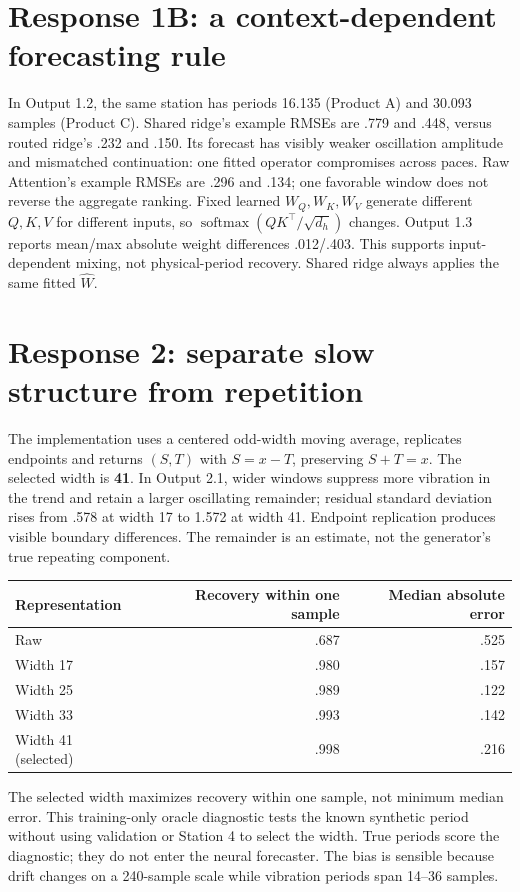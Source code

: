 \documentclass[10pt,a4paper]{article}
\begin{document}
\section*{Response 1B: a context-dependent forecasting rule}
In Output 1.2, the same station has periods 16.135 (Product A) and 30.093 samples (Product C). Shared ridge's example RMSEs are .779 and .448, versus routed ridge's .232 and .150. Its forecast has visibly weaker oscillation amplitude and mismatched continuation: one fitted operator compromises across paces. Raw Attention's example RMSEs are .296 and .134; one favorable window does not reverse the aggregate ranking. Fixed learned $W_Q,W_K,W_V$ generate different $Q,K,V$ for different inputs, so $\operatorname{softmax}(QK^\top/\sqrt{d_h})$ changes. Output 1.3 reports mean/max absolute weight differences .012/.403. This supports input-dependent mixing, not physical-period recovery. Shared ridge always applies the same fitted $\widehat W$.

\newpage
\section*{Response 2: separate slow structure from repetition}
The implementation uses a centered odd-width moving average, replicates endpoints and returns $(S,T)$ with $S=x-T$, preserving $S+T=x$. The selected width is \textbf{41}. In Output 2.1, wider windows suppress more vibration in the trend and retain a larger oscillating remainder; residual standard deviation rises from .578 at width 17 to 1.572 at width 41. Endpoint replication produces visible boundary differences. The remainder is an estimate, not the generator's true repeating component.

\begin{center}\small
\begin{tabular}{lrr}\toprule
Representation & Recovery within one sample & Median absolute error\\\midrule
Raw & .687 & .525\\
Width 17 & .980 & .157\\
Width 25 & .989 & .122\\
Width 33 & .993 & .142\\
Width 41 (selected) & .998 & .216\\\bottomrule
\end{tabular}\end{center}
The selected width maximizes recovery within one sample, not minimum median error. This training-only oracle diagnostic tests the known synthetic period without using validation or Station 4 to select the width. True periods score the diagnostic; they do not enter the neural forecaster. The bias is sensible because drift changes on a 240-sample scale while vibration periods span 14--36 samples.
\end{document}

